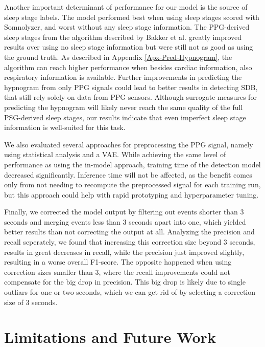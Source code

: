 Another important determinant of performance for our model is the source of sleep stage labels. The model performed best when using sleep stages scored with Somnolyzer, and worst without any sleep stage information. The PPG-derived sleep stages from the algorithm described by Bakker et al. \cite{bakker2021estimating} greatly improved results over using no sleep stage information but were still not as good as using the ground truth. As described in Appendix \ref{Apx-Pred-Hypnogram}, the algorithm can reach higher performance when besides cardiac information, also respiratory information is available. Further improvements in predicting the hypnogram from only PPG signals could lead to better results in detecting SDB, that still rely solely on data from PPG sensors.
Although surrogate measures for predicting the hypnogram will likely never reach the same quality of the full PSG-derived sleep stages, our results indicate that even imperfect sleep stage information is well-suited for this task.

We also evaluated several approaches for preprocessing the PPG signal, namely using statistical analysis and a VAE. While achieving the same level of performance as using the in-model approach, training time of the detection model decreased significantly. Inference time will not be affected, as the benefit comes only from not needing to recompute the preprocessed signal for each training run, but this approach could help with rapid prototyping and hyperparameter tuning.

Finally, we corrected the model output by filtering out events shorter than 3 seconds and merging events less than 3 seconds apart into one, which yielded better results than not correcting the output at all.
Analyzing the precision and recall seperately, we found that increasing this correction size beyond 3 seconds, results in great decreases in recall, while the precision just improved slightly, resulting in a worse overall F1-score. The opposite happened when using correction sizes smaller than 3, where the recall improvements could not compensate for the big drop in precision. This big drop is likely due to single outliars for one or two seconds, which we can get rid of by selecting a correction size of 3 seconds.

\section{Limitations and Future Work}


